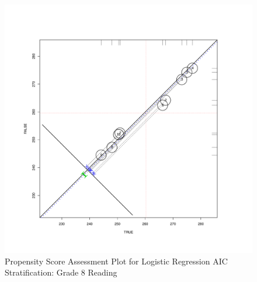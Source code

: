 \clearpage
\begin{figure}
\begin{center}
\includegraphics[height=.4\textheight,width=.4\textheight]{../Figures2009/g8read-circpsa10-AIC.pdf}
\caption{Propensity Score Assessment Plot for Logistic Regression AIC Stratification: Grade 8 Reading}
\end{center}
\end{figure}



